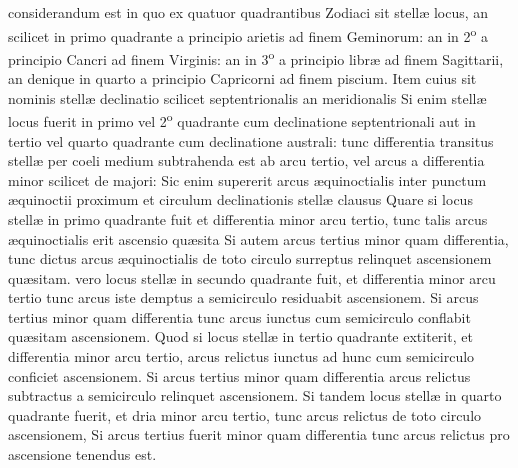 \documentclass[11pt,a4paper]{article}
\begin{document}

considerandum est in quo ex quatuor quadrantibus Zodiaci sit stellæ locus, an scilicet in primo quadrante a principio arietis ad finem Geminorum: an in 2\textsuperscript{o} a principio Cancri ad finem Virginis: an in 3\textsuperscript{o} a principio libræ ad finem Sagittarii, an denique in quarto a principio Capricorni ad finem piscium. Item cuius sit nominis stellæ declinatio scilicet septentrionalis an meridionalis Si enim stellæ locus fuerit in primo vel 2\textsuperscript{o} quadrante cum declinatione septentrionali aut in tertio vel quarto quadrante cum declinatione australi: tunc differentia transitus stellæ per coeli medium subtrahenda est ab arcu tertio, vel arcus a differentia minor scilicet de majori: Sic enim supererit arcus æquinoctialis inter punctum æquinoctii proximum et circulum declinationis stellæ clausus Quare si locus stellæ in primo quadrante fuit et differentia minor arcu tertio, tunc talis arcus æquinoctialis erit ascensio quæsita Si autem arcus tertius minor quam differentia, tunc dictus arcus æquinoctialis de toto circulo surreptus relinquet ascensionem quæsitam.  vero locus stellæ in secundo quadrante fuit, et differentia minor arcu tertio tunc arcus iste demptus a semicirculo residuabit ascensionem. Si arcus  tertius minor quam differentia tunc arcus iunctus cum semicirculo conflabit quæsitam ascensionem. Quod si locus stellæ in tertio quadrante extiterit, et differentia minor arcu tertio, arcus relictus iunctus ad hunc cum semicirculo conficiet ascensionem. Si arcus tertius minor quam differentia arcus relictus subtractus a semicirculo  relinquet ascensionem. 
Si tandem locus stellæ in quarto quadrante fuerit, et dria minor arcu tertio, tunc arcus relictus de toto circulo  ascensionem, Si arcus tertius fuerit minor quam differentia tunc arcus relictus pro ascensione tenendus est.
\end{document}
